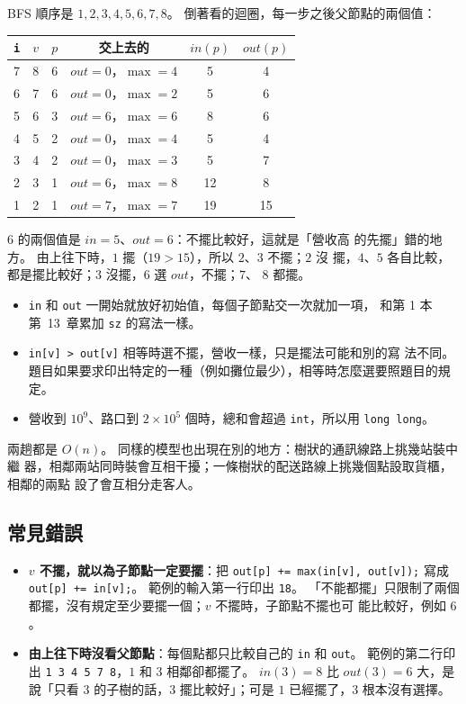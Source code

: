BFS 順序是 $1, 2, 3, 4, 5, 6, 7, 8$。 倒著看的迴圈，每一步之後父節點的兩個值：

\begin{center}
\begin{tabular}{cccccc}
\toprule
\texttt{i} & $v$ & $p$ & 交上去的 & $\mathit{in}(p)$ & $\mathit{out}(p)$ \\
\midrule
7 & 8 & 6 & $\mathit{out} = 0$，$\max = 4$ & 5 & 4 \\
6 & 7 & 6 & $\mathit{out} = 0$，$\max = 2$ & 5 & 6 \\
5 & 6 & 3 & $\mathit{out} = 6$，$\max = 6$ & 8 & 6 \\
4 & 5 & 2 & $\mathit{out} = 0$，$\max = 4$ & 5 & 4 \\
3 & 4 & 2 & $\mathit{out} = 0$，$\max = 3$ & 5 & 7 \\
2 & 3 & 1 & $\mathit{out} = 6$，$\max = 8$ & 12 & 8 \\
1 & 2 & 1 & $\mathit{out} = 7$，$\max = 7$ & 19 & 15 \\
\bottomrule
\end{tabular}
\end{center}

$6$ 的兩個值是 $\mathit{in} = 5$、$\mathit{out} = 6$：不擺比較好，這就是「營收高
的先擺」錯的地方。 由上往下時，$1$ 擺（$19 > 15$），所以 $2$、$3$ 不擺；$2$ 沒
擺，$4$、$5$ 各自比較，都是擺比較好；$3$ 沒擺，$6$ 選 $\mathit{out}$，不擺；$7$、
$8$ 都擺。

\begin{itemize}
\item \texttt{in} 和 \texttt{out} 一開始就放好初始值，每個子節點交一次就加一項，
和第 1 本第~13~章累加 \texttt{sz} 的寫法一樣。
\item \texttt{in[v] > out[v]} 相等時選不擺，營收一樣，只是擺法可能和別的寫
法不同。 題目如果要求印出特定的一種（例如攤位最少），相等時怎麼選要照題目的規定。
\item 營收到 $10^9$、路口到 $2 \times 10^5$ 個時，總和會超過 \texttt{int}，所以用
\texttt{long long}。
\end{itemize}

兩趟都是 $O(n)$。 同樣的模型也出現在別的地方：樹狀的通訊線路上挑幾站裝中繼
器，相鄰兩站同時裝會互相干擾；一條樹狀的配送路線上挑幾個點設取貨櫃，相鄰的兩點
設了會互相分走客人。

\subsection{常見錯誤}

\begin{itemize}
\item \textbf{$v$ 不擺，就以為子節點一定要擺}：把 \texttt{out[p] += max(in[v],
out[v]);} 寫成 \texttt{out[p] += in[v];}。 範例的輸入第一行印出 \texttt{18}。
「不能都擺」只限制了兩個都擺，沒有規定至少要擺一個；$v$ 不擺時，子節點不擺也可
能比較好，例如 $6$。
\item \textbf{由上往下時沒看父節點}：每個點都只比較自己的 \texttt{in} 和
\texttt{out}。 範例的第二行印出 \texttt{1 3 4 5 7 8}，$1$ 和 $3$ 相鄰卻都擺了。
$\mathit{in}(3) = 8$ 比 $\mathit{out}(3) = 6$ 大，是說「只看 $3$ 的子樹的話，$3$
擺比較好」；可是 $1$ 已經擺了，$3$ 根本沒有選擇。
\end{itemize}


